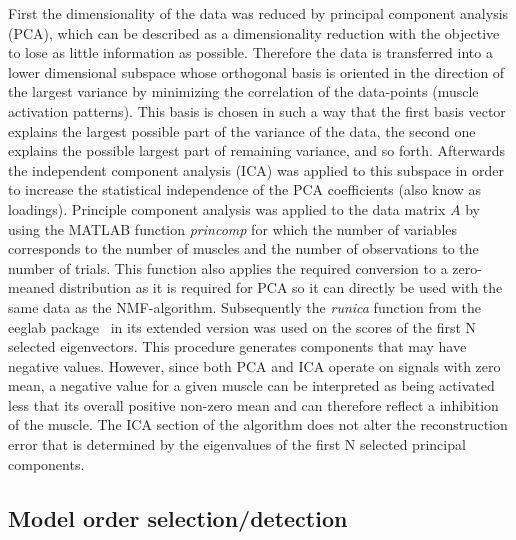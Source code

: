 First the dimensionality of the data was reduced by principal component analysis (PCA), which can be described as a dimensionality reduction with the objective to lose as little information as possible. Therefore the data is transferred into a lower dimensional subspace whose orthogonal basis is oriented in the direction of the largest variance by minimizing the correlation of the data-points (muscle activation patterns). This basis is chosen in such a way that the first basis vector explains the largest possible part of the variance of the data, the second one explains the possible largest part of remaining variance, and so forth. 
Afterwards the independent component analysis (ICA) was applied to this subspace in order to increase the statistical independence of the PCA coefficients (also know as loadings). Principle component analysis was applied to the data matrix $A$ by using the MATLAB function \emph{princomp} for which the number of variables corresponds to the number of muscles and the number of observations to the number of trials. This function also applies the required conversion to a zero-meaned distribution as it is required for PCA so it can directly be used with the same data as the NMF-algorithm. Subsequently the \emph{runica} function from the eeglab package~\citet{eeg} in its extended version was used on the scores of the first N selected eigenvectors. 
This procedure generates components that may have negative values. However, since both PCA and ICA operate on signals with zero mean, a negative value for a given muscle can be interpreted as being activated less that its overall positive non-zero mean and can therefore reflect a inhibition of the muscle. The ICA section of the algorithm does not alter the reconstruction error that is determined by the eigenvalues of the first N selected principal components.

\subsection{Model order selection/detection} %
\label{sg:sub:model_order}

